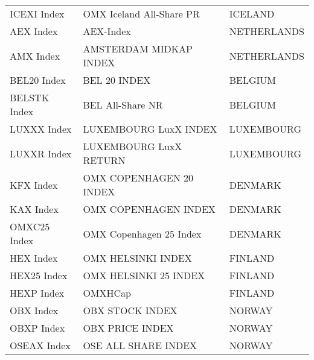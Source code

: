 \begin {table}[H]
\begin{center}
\begin{tabu}{| l l l |}
ICEXI Index & OMX Iceland All-Share PR & ICELAND \\ 
AEX Index & AEX-Index & NETHERLANDS \\ 
AMX Index & AMSTERDAM MIDKAP INDEX & NETHERLANDS \\ 
BEL20 Index & BEL 20 INDEX & BELGIUM \\ 
BELSTK Index & BEL All-Share NR & BELGIUM \\ 
LUXXX Index & LUXEMBOURG LuxX INDEX & LUXEMBOURG \\ 
LUXXR Index & LUXEMBOURG LuxX RETURN & LUXEMBOURG \\ 
KFX Index & OMX COPENHAGEN 20 INDEX & DENMARK \\ 
KAX Index & OMX COPENHAGEN INDEX & DENMARK \\ 
OMXC25 Index & OMX Copenhagen 25 Index & DENMARK \\ 
HEX Index & OMX HELSINKI INDEX & FINLAND \\ 
HEX25 Index & OMX HELSINKI 25 INDEX & FINLAND \\ 
HEXP Index & OMXHCap & FINLAND \\ 
OBX Index & OBX STOCK INDEX & NORWAY \\ 
OBXP Index & OBX PRICE INDEX & NORWAY \\ 
OSEAX Index & OSE ALL SHARE INDEX & NORWAY \\ 


\hline
\end{tabu}
\hspace*{-3cm}
\small
\end{center}
\end{table}


